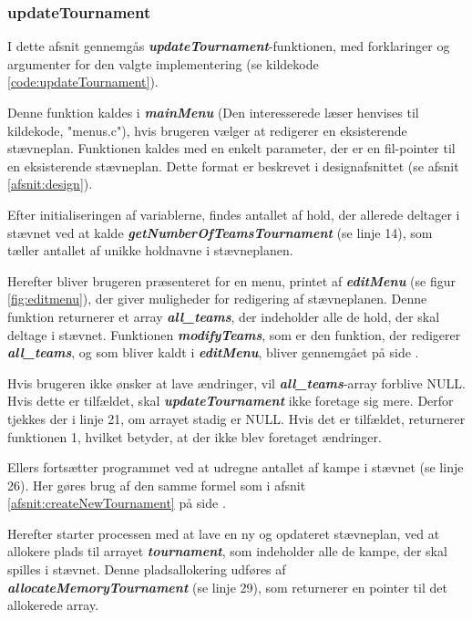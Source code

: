 \subsubsection{updateTournament}
I dette afsnit gennemgås \textbf{\textit{updateTournament}}-funktionen, med forklaringer og argumenter for den valgte implementering (se kildekode \ref{code:updateTournament}).
\par
Denne funktion kaldes i \textbf{\textit{mainMenu}} (Den interesserede læser henvises til kildekode, "menus.c"), hvis brugeren vælger at redigerer en eksisterende stævneplan. Funktionen kaldes med en enkelt parameter, der er en fil-pointer til en eksisterende stævneplan. Dette format er beskrevet i designafsnittet (se afsnit \ref{afsnit:design}).
\par
Efter initialiseringen af variablerne, findes antallet af hold, der allerede deltager i stævnet ved at kalde \textbf{\textit{getNumberOfTeamsTournament}} (se linje 14), som tæller antallet af unikke holdnavne i stævneplanen. 
\par
Herefter bliver brugeren præsenteret for en menu, printet af \textbf{\textit{editMenu}} (se figur \ref{fig:editmenu}), der giver muligheder for redigering af stævneplanen. Denne funktion returnerer et array \textbf{\textit{all\_teams}}, der indeholder alle de hold, der skal deltage i stævnet. Funktionen \textbf{\textit{modifyTeams}}, som er den funktion, der redigerer \textbf{\textit{all\_teams}}, og som bliver kaldt i \textbf{\textit{editMenu}}, bliver gennemgået på side \pageref{afsnit:modifyTeams}.
\par
Hvis brugeren ikke ønsker at lave ændringer, vil \textbf{\textit{all\_teams}}-array forblive NULL. Hvis dette er tilfældet, skal \textbf{\textit{updateTournament}} ikke foretage sig mere. Derfor tjekkes der i linje 21, om arrayet stadig er NULL. Hvis det er tilfældet, returnerer funktionen 1, hvilket betyder, at der ikke blev foretaget ændringer.
\par
Ellers fortsætter programmet ved at udregne antallet af kampe i stævnet (se linje 26). Her gøres brug af den samme formel som i afsnit \ref{afsnit:createNewTournament} på side \pageref{afsnit:createNewTournament}.
\par
Herefter starter processen med at lave en ny og opdateret stævneplan, ved at allokere plads til arrayet \textbf{\textit{tournament}}, som indeholder alle de kampe, der skal spilles i stævnet.
Denne pladsallokering udføres af \textbf{\textit{allocateMemoryTournament}} (se linje 29), som returnerer en pointer til det allokerede array.
\clearpage

